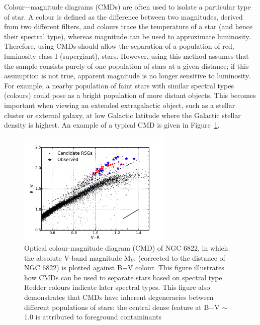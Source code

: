 Colour$-$magnitude diagrams (CMDs) are often used to isolate a particular type of star.
A colour is defined as the difference between two magnitudes, derived from  two different filters, and colours trace the temperature of a star (and hence their spectral type), whereas magnitude can be used to approximate luminosity.
Therefore, using CMDs should allow the separation of a population of red, luminosity class I (supergiant), stars.
However, using this method assumes that the sample consists purely of one population of stars at a given distance; if this assumption is not true, apparent magnitude is no longer sensitive to luminosity.
For example, a nearby population of faint stars with similar spectral types (colours) could pose as a bright population of more distant objects.
This becomes important when viewing an extended extragalactic object, such as a stellar cluster or external galaxy, at low Galactic latitude where the Galactic stellar density is highest.
An example of a typical CMD is given in Figure~\ref{fig:CMD}.

 \begin{figure}
 \centering
 \includegraphics[width=0.65\textwidth]{intro/N6822_bvr}
 \caption[B$-$V, V]{Optical colour-magnitude diagram (CMD) of NGC 6822, in which the absolute V-band magnitude M$_{V}$, (corrected to the distance of NGC 6822) is plotted against B$-$V colour.
This figure illustrates how CMDs can be used to separate stars based on spectral type. Redder colours indicate later spectral types.
This figure also demonstrates that CMDs have inherent degeneracies  between different populations of stars: the central dense feature at B$-$V $\sim$ 1.0 is attributed to foreground contaminants
 \label{fig:CMD}}
\end{figure}

